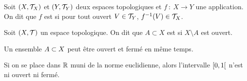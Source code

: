 \begin{definition}
    Soit \((X, \mathcal{T}_X)\) et \((Y, \mathcal{T}_Y)\) deux espaces topologiques
    et \(f\ \colon\ X \to Y\) une application.
    On dit que \(f\) est  si pour tout ouvert \(V \in \mathcal{T}_Y\),
    \(f^{-1}(V) \in \mathcal{T}_X\).
\end{definition}

\begin{definition}
    Soit \((X, \mathcal{T})\) un espace topologique.
    On dit que \(A \subset X\) est  si \(X \setminus A\) est ouvert.
\end{definition}

\begin{remark}
    Un ensemble \(A\subset X\) peut être ouvert et fermé en même temps.
\end{remark}

\begin{example}
    Si on se place dans \(\mathbb{R}\) muni de la norme euclidienne, alors
    l'intervalle \(\mathopen{}\left[0, 1\right[\mathclose{}\) n'est ni ouvert ni fermé.
\end{example}